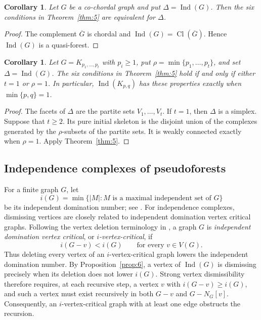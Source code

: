 \documentclass[11pt]{amsart}
\DeclareMathOperator{\Ind}{Ind}
\DeclareMathOperator{\Cl}{Cl}
\newtheorem{corollary}[theorem]{Corollary}
\theoremstyle{definition}
\begin{document}
	\begin{corollary}\label{cor:4}
		Let $G$ be a co-chordal graph and put $\Delta=\Ind(G)$.  Then the six conditions in Theorem~\ref{thm:5} are equivalent for $\Delta$.
	\end{corollary}
	
	\begin{proof}
		The complement $\overline G$ is chordal and $\Ind(G)=\Cl(\overline G)$.  Hence $\Ind(G)$ is a quasi-forest.
	\end{proof}
	
	\begin{corollary}
		\label{cor:5}
		Let $G=K_{p_1,\ldots,p_t}$ with $p_i\geq1$, put $\rho=\min\{p_1,\ldots,p_t\}$, and set $\Delta=\Ind(G)$.  The six conditions in Theorem~\ref{thm:5} hold if and only if either $t=1$ or $\rho=1$.  In particular, $\Ind(K_{p,q})$ has these properties exactly when $\min\{p,q\}=1$.
	\end{corollary}
	
	\begin{proof}
		The facets of $\Delta$ are the partite sets $V_1,\ldots,V_t$.  If $t=1$, then $\Delta$ is a simplex.  Suppose that $t\geq2$.  Its pure initial skeleton is the disjoint union of the complexes generated by the $\rho$-subsets of the partite sets.  It is weakly connected exactly when $\rho=1$.  Apply Theorem~\ref{thm:5}.
	\end{proof}
	
	\subsection{Independence complexes of pseudoforests}
	\label{subsec:3}
	
	For a finite graph $G$, let
	\[
	i(G)=\min\{|M|:M\text{ is a maximal independent set of }G\}
	\]
	be its independent domination number; see \cite{Haynes1998}. For independence complexes, dismissing vertices are closely related to independent domination vertex critical graphs. Following the vertex deletion terminology in \cite{EdwardsMacGillivray2012,AnanchuenEtAl2018}, a graph $G$ is \emph{independent domination vertex critical}, or \emph{$i$-vertex-critical}, if
	\[
	i(G-v)<i(G)
	\qquad\text{for every }v\in V(G).
	\]
	Thus deleting every vertex of an $i$-vertex-critical graph lowers the independent domination number. By Proposition~\ref{prop:6}, a vertex of $\Ind(G)$ is dismissing precisely when its deletion does not lower $i(G)$. Strong vertex dismissibility therefore requires, at each recursive step, a vertex $v$ with $i(G-v)\geq i(G)$, and such a vertex must exist recursively in both $G-v$ and $G-N_G[v]$. Consequently, an $i$-vertex-critical graph with at least one edge obstructs the recursion.
	
\end{document}
